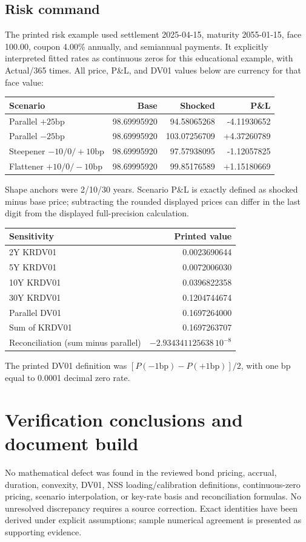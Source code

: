 \documentclass[12pt,a4paper]{article}
\newcommand{\bp}{\mathrm{bp}}
\begin{document}
\subsection{Risk command}
The printed risk example used settlement 2025-04-15, maturity 2055-01-15,
face 100.00, coupon 4.00\% annually, and semiannual payments.
It explicitly interpreted fitted rates as continuous zeros for this
educational example, with Actual/365 times.
All price, P\&L, and DV01 values below are currency for that face value:
\begin{center}\small
\begin{tabular}{@{}lrrr@{}}
\toprule
Scenario & Base & Shocked & P\&L\\
\midrule
Parallel $+25\bp$ & 98.69995920 & 94.58065268 & -4.11930652\\
Parallel $-25\bp$ & 98.69995920 & 103.07256709 & +4.37260789\\
Steepener $-10/0/+10\bp$ & 98.69995920 & 97.57938095 & -1.12057825\\
Flattener $+10/0/-10\bp$ & 98.69995920 & 99.85176589 & +1.15180669\\
\bottomrule
\end{tabular}
\end{center}
Shape anchors were 2/10/30 years. Scenario P\&L is exactly defined as
shocked minus base price; subtracting the rounded displayed prices can
differ in the last digit from the displayed full-precision calculation.
\begin{center}\small
\begin{tabular}{@{}lr@{}}
\toprule
Sensitivity & Printed value\\
\midrule
2Y KRDV01 & 0.0023690644\\
5Y KRDV01 & 0.0072006030\\
10Y KRDV01 & 0.0396822358\\
30Y KRDV01 & 0.1204744674\\
Parallel DV01 & 0.1697264000\\
Sum of KRDV01 & 0.1697263707\\
Reconciliation (sum minus parallel) & $-2.934341125638\,10^{-8}$\\
\bottomrule
\end{tabular}
\end{center}
The printed DV01 definition was $[P(-1\bp)-P(+1\bp)]/2$, with one bp
equal to 0.0001 decimal zero rate.

\section{Verification conclusions and document build}
No mathematical defect was found in the reviewed bond pricing, accrual,
duration, convexity, DV01, NSS loading/calibration definitions,
continuous-zero pricing, scenario interpolation, or key-rate basis and
reconciliation formulas. No unresolved discrepancy requires a source
correction. Exact identities have been derived under explicit assumptions;
sample numerical agreement is presented as supporting evidence.
\end{document}
